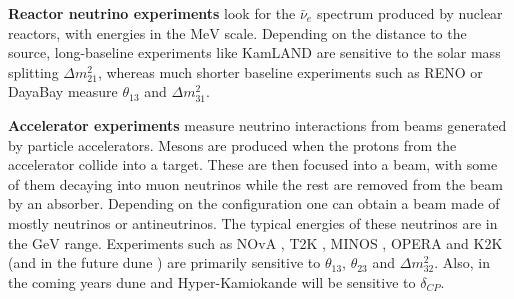 \textbf{Reactor neutrino experiments} look for the $\bar{\nu}_{e}$ spectrum produced by nuclear reactors, with energies in the $\mathrm{MeV}$ scale. Depending on the distance to the source, long-baseline experiments like KamLAND \cite{KamLAND2013} are sensitive to the solar mass splitting $\Delta m^{2}_{21}$, whereas much shorter baseline experiments such as RENO \cite{RENO2018} or DayaBay \cite{DayaBay2018} measure $\theta_{13}$ and $\Delta m^{2}_{31}$.

\textbf{Accelerator experiments} measure neutrino interactions from beams generated by particle accelerators. Mesons are produced when the protons from the accelerator collide into a target. These are then focused into a beam, with some of them decaying into muon neutrinos while the rest are removed from the beam by an absorber. Depending on the configuration one can obtain a beam made of mostly neutrinos or antineutrinos. The typical energies of these neutrinos are in the $\mathrm{GeV}$ range. Experiments such as NOvA \cite{NOvA2023}, T2K \cite{T2K2023}, MINOS \cite{MINOS2014}, OPERA \cite{OPERA2018} and K2K \cite{K2K2006} (and in the future \gls{dune} \cite{DUNE2020}) are primarily sensitive to $\theta_{13}$, $\theta_{23}$ and $\Delta m^{2}_{32}$. Also, in the coming years \gls{dune} \cite{DUNE2020} and Hyper-Kamiokande \cite{Hyper-Kamiokande2019} will be sensitive to $\delta_{CP}$.

